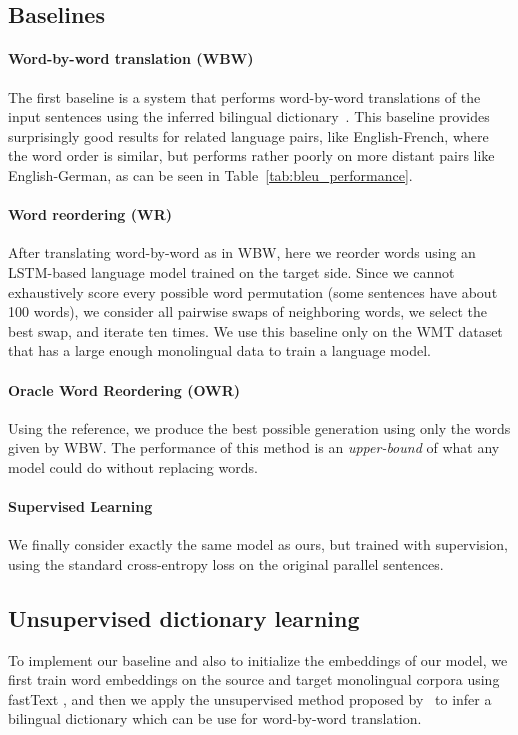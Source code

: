 \documentclass{article} \usepackage{iclr2018_conference,times}
\begin{document}
\subsection{Baselines}

\paragraph{Word-by-word translation (WBW)} The first baseline is a system that performs word-by-word translations of the input sentences using the inferred bilingual dictionary~\citep{wordalign17}. This baseline provides surprisingly good results for related language pairs, like English-French, where the word order is similar, but performs rather poorly on more distant pairs like English-German, as can be seen in Table~\ref{tab:bleu_performance}.

\paragraph{Word reordering (WR)} 
After translating word-by-word as in WBW, here we reorder words using an LSTM-based language model trained on the target side. Since we cannot exhaustively score every possible word permutation (some sentences have about 100 words), we consider all pairwise swaps of neighboring words, we select the best swap, and iterate ten times. We use this baseline only on the WMT dataset that has a large enough monolingual data to train a language model.

\paragraph{Oracle Word Reordering (OWR)} Using the reference, we produce the best possible generation using only the words given by WBW. The performance of this method is an \textit{upper-bound} of what any model could do without replacing words. 

\paragraph{Supervised Learning} 
We finally consider exactly the same model as ours, but trained with supervision, using the standard cross-entropy loss on the original parallel sentences.

\subsection{Unsupervised dictionary learning} To implement our baseline and also to initialize the embeddings  of our model, we first train word embeddings on the source and target monolingual corpora using fastText \citep{bojanowski2016enriching}, and then we apply the unsupervised method proposed by~\citet{wordalign17} to infer a bilingual dictionary which can be use for word-by-word translation. 
\end{document}
